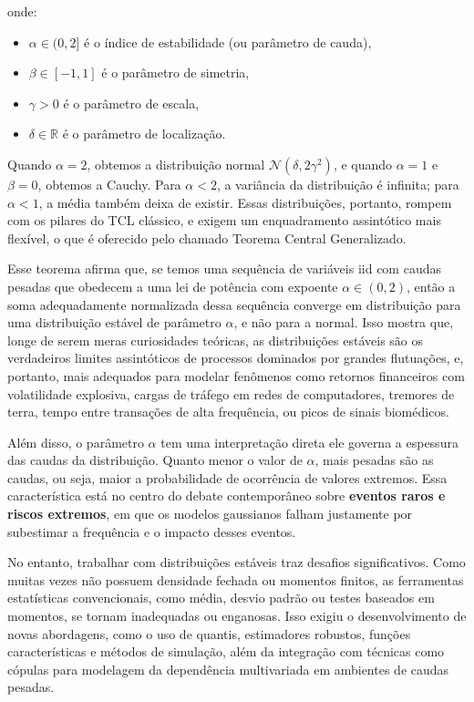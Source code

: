 \documentclass[
]{agujournal2019}
\providecommand{\tightlist}{%
  \setlength{\itemsep}{0pt}\setlength{\parskip}{0pt}}\usepackage{longtable,booktabs,array}
\begin{document}
onde:

\begin{itemize}
\tightlist
\item
  \(\alpha \in (0, 2]\) é o índice de estabilidade (ou parâmetro de
  cauda),
\item
  \(\beta \in [-1,1]\) é o parâmetro de simetria,
\item
  \(\gamma > 0\) é o parâmetro de escala,
\item
  \(\delta \in \mathbb{R}\) é o parâmetro de localização.
\end{itemize}

Quando \(\alpha = 2\), obtemos a distribuição normal
\(\mathcal{N}(\delta, 2\gamma^2)\), e quando \(\alpha = 1\) e
\(\beta = 0\), obtemos a Cauchy. Para \(\alpha < 2\), a variância da
distribuição é infinita; para \(\alpha < 1\), a média também deixa de
existir. Essas distribuições, portanto, rompem com os pilares do TCL
clássico, e exigem um enquadramento assintótico mais flexível, o que é
oferecido pelo chamado Teorema Central Generalizado.

Esse teorema afirma que, se temos uma sequência de variáveis iid com
caudas pesadas que obedecem a uma lei de potência com expoente
\(\alpha \in (0,2)\), então a soma adequadamente normalizada dessa
sequência converge em distribuição para uma distribuição estável de
parâmetro \(\alpha\), e não para a normal. Isso mostra que, longe de
serem meras curiosidades teóricas, as distribuições estáveis são os
verdadeiros limites assintóticos de processos dominados por grandes
flutuações, e, portanto, mais adequados para modelar fenômenos como
retornos financeiros com volatilidade explosiva, cargas de tráfego em
redes de computadores, tremores de terra, tempo entre transações de alta
frequência, ou picos de sinais biomédicos.

Além disso, o parâmetro \(\alpha\) tem uma interpretação direta ele
governa a espessura das caudas da distribuição. Quanto menor o valor de
\(\alpha\), mais pesadas são as caudas, ou seja, maior a probabilidade
de ocorrência de valores extremos. Essa característica está no centro do
debate contemporâneo sobre \textbf{eventos raros e riscos extremos}, em
que os modelos gaussianos falham justamente por subestimar a frequência
e o impacto desses eventos.

No entanto, trabalhar com distribuições estáveis traz desafios
significativos. Como muitas vezes não possuem densidade fechada ou
momentos finitos, as ferramentas estatísticas convencionais, como média,
desvio padrão ou testes baseados em momentos, se tornam inadequadas ou
enganosas. Isso exigiu o desenvolvimento de novas abordagens, como o uso
de quantis, estimadores robustos, funções características e métodos de
simulação, além da integração com técnicas como cópulas para modelagem
da dependência multivariada em ambientes de caudas pesadas.
\end{document}
